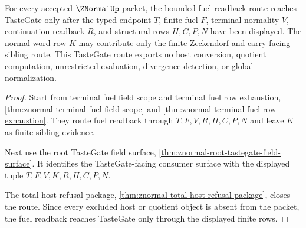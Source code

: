 \begin{theorem}
\label{thm:znormal-fuel-readback-tastegate-route}
For every accepted $\ZNormalUp$ packet, the bounded fuel readback route reaches TasteGate only after the typed endpoint $T$, finite fuel $F$, terminal normality $V$, continuation readback $R$, and structural rows $H,C,P,N$ have been displayed. The normal-word row $K$ may contribute only the finite Zeckendorf and carry-facing sibling route. This TasteGate route exports no host conversion, quotient computation, unrestricted evaluation, divergence detection, or global normalization.
\end{theorem}
\begin{proof}
Start from terminal fuel field scope and terminal fuel row exhaustion, \autoref{thm:znormal-terminal-fuel-field-scope} and \autoref{thm:znormal-terminal-fuel-row-exhaustion}. They route fuel readback through $T,F,V,R,H,C,P,N$ and leave $K$ as finite sibling evidence.

Next use the root TasteGate field surface, \autoref{thm:znormal-root-tastegate-field-surface}. It identifies the TasteGate-facing consumer surface with the displayed tuple $T,F,V,K,R,H,C,P,N$.

The total-host refusal package, \autoref{thm:znormal-total-host-refusal-package}, closes the route. Since every excluded host or quotient object is absent from the packet, the fuel readback reaches TasteGate only through the displayed finite rows.
\end{proof}

